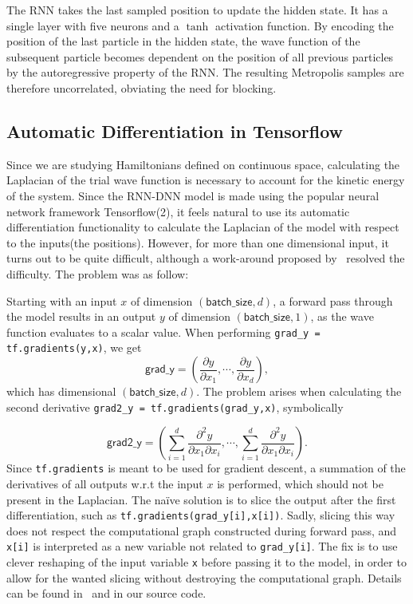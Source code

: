 The RNN takes the last sampled position to update the hidden state. It has a
single layer with five neurons and a \(\tanh\) activation function. 
By encoding the position of the last particle in the hidden state, the wave
function of the subsequent particle becomes dependent on the position of all
previous particles by the autoregressive property of the RNN. The resulting
Metropolis samples are therefore uncorrelated, obviating the need for blocking.


\subsection{Automatic Differentiation in Tensorflow}
Since we are studying Hamiltonians defined on continuous space, calculating the
Laplacian of the trial wave function is necessary to account for the kinetic
energy of the system. Since the RNN-DNN model is made using the popular neural
network framework Tensorflow(2), it feels natural to use its automatic
differentiation functionality to calculate the Laplacian of the model with
respect to the inputs(the positions). However, for more than one dimensional
input, it turns out to be quite difficult, although a work-around proposed by~\cite{laplace}
resolved the difficulty. The problem was as follow:  

Starting with an input $x$ of dimension $(\textsf{batch\_size}, d)$, a forward
pass through the model results in an output $y$ of dimension $(\textsf{batch\_size}, 1)$,
as the wave function evaluates to a scalar value. When performing
\texttt{grad_y = tf.gradients(y,x)}, we get  
\begin{equation*}
	\textsf{grad\_y} = \left(\frac{\partial y}{\partial x_1}, \cdots, \frac{\partial y}{\partial x_d}\right),
\end{equation*}
which has dimensional $(\textsf{batch\_size}, d)$. The problem arises when
calculating the second
derivative \texttt{grad2_y = tf.gradients(grad_y,x)}, symbolically

\begin{equation*}
	\textsf{grad2\_y} = \left(\sum_{i=1}^{d}\frac{\partial^2 y}{\partial x_1 \partial x_i}, \cdots, \sum_{i=1}^{d}\frac{\partial^2 y}{\partial x_1 \partial x_i}\right).
\end{equation*}
Since \texttt{tf.gradients} is meant to be used for gradient
descent, a summation of the derivatives of all outputs w.r.t the input $x$ is
performed, which should not be present in the Laplacian. 
The naïve solution is to slice the output after the first differentiation, such as\newline 
\texttt{tf.gradients(grad_y[i],x[i])}. Sadly, slicing this way does not respect
the computational graph constructed during forward pass, and \texttt{x[i]} is
interpreted as a new variable not related to \texttt{grad_y[i]}. The fix is to
use clever reshaping of the input variable \texttt{x} before passing it to the
model, in order to allow for the wanted slicing without destroying the
computational graph. Details can be found in~\cite{laplace} and in our source code.  

